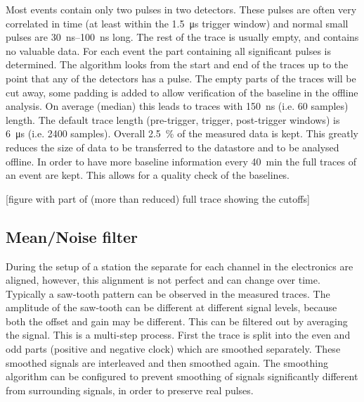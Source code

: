 Most events contain only two pulses in two detectors. These pulses are often very correlated in time (at least within the \SI{1.5}{\micro\second} trigger window) and normal small pulses are \SIrange{30}{100}{\ns} long. The rest of the trace is usually empty, and contains no valuable data. For each event the part containing all significant pulses is determined. The algorithm looks from the start and end of the traces up to the point that any of the detectors has a pulse. The empty parts of the traces will be cut away, some padding is added to allow verification of the baseline in the offline analysis. On average (median) this leads to traces with \SI{150}{\ns} (i.e. 60 samples) length. The default trace length (pre-trigger, trigger, post-trigger windows) is \SI{6}{\micro\second} (i.e. 2400 samples). Overall \SI{2.5}{\percent} of the measured data is kept. This greatly reduces the size of data to be transferred to the datastore and to be analysed offline. In order to have more baseline information every \SI{40}{\minute} the full traces of an event are kept. This allows for a quality check of the baselines.

[figure with part of (more than reduced) full trace showing the cutoffs]



\subsection{Mean/Noise filter}

During the setup of a station the separate \adcs for each channel in the \hisparc electronics are aligned, however, this alignment is not perfect and can change over time. Typically a saw-tooth pattern can be observed in the measured traces. The amplitude of the saw-tooth can be different at different signal levels, because both the offset and gain may be different. This can be filtered out by averaging the signal. This is a multi-step process. First the trace is split into the even and odd parts (positive and negative clock) which are smoothed separately. These smoothed signals are interleaved and then smoothed again. The smoothing algorithm can be configured to prevent smoothing of signals significantly different from surrounding signals, in order to preserve real pulses. 

